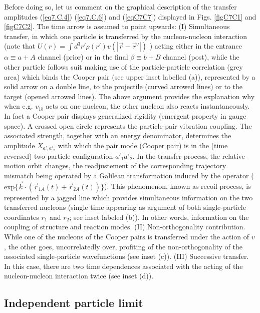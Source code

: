 \begin{subappendices}
Before doing so, let us comment on the graphical description of the transfer amplitudes (\ref{eq7.C.4}) (\ref{eq7.C.6}) and (\ref{eqC7C7}) displayed in Figs. \ref{figC7C1}
and \ref{figC7C2}. The time arrow is assumed to point upwards:
(I) Simultaneous transfer, in which one particle is transferred by the nucleon-nucleon interaction (note that $U(r)=\int d^3 r' \rho(r')v(|\vec r-\vec r'|)$ ) acting either in the entrance $\alpha \equiv a+A$ channel (prior) or in the final $\beta \equiv b + B$ channel (post), while the other particle follows suit making use of the particle-particle correlation (grey area) which binds the Cooper pair (see upper inset labelled (a)), represented by a solid arrow on a double line, to the projectile (curved arrowed lines) or to the target (opened arrowed lines). The above argument provides the explanation why when e.g. $v_{1b}$ acts on one nucleon, the other nucleon also reacts instantaneously. In fact a Cooper pair displays generalized rigidity (emergent property in gauge space).
A crossed open circle represents the particle-pair vibration coupling. The associated strength, together with an energy denominator, determines the amplitude $X_{a'_1 a'_2}$  with which the pair mode (Cooper pair) is in the (time reversed) two particle configuration $a'_1 a'_2$. In the transfer process, the  relative motion orbit changes, the readjustement of the corresponding trajectory mismatch being operated by a Galilean transformation induced by the operator ($\textrm{exp}\{ \vec k \cdot (\vec{r}_{1A}(t)+\vec{r}_{2A}(t))\}$). This phenomenon, known as recoil process, is represented by a jagged line which  provides simultaneous information on the two transferred nucleons (single time appearing as argument of both single-particle coordinates $r_1$ and $r_2$; see inset labeled (b)). In other words, information on the coupling of structure and reaction modes.
(II) Non-orthogonality contribution. While one of the nucleons of the Cooper pairs is transferred under the action of $v$, the other goes, uncorrelatedly over, profiting of the non-orthogonality of the associated single-particle wavefunctions (see inset (c)). 
(III) Successive transfer. In this case, there are two time dependences associated with the acting of the nucleon-nucleon interaction twice (see inset (d)). 


\subsection{Independent particle limit}\label{C7S7C1}


\end{subappendices}
